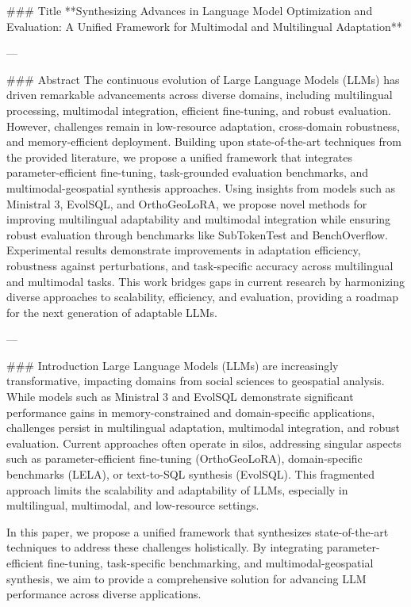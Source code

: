 ### Title  
**Synthesizing Advances in Language Model Optimization and Evaluation: A Unified Framework for Multimodal and Multilingual Adaptation**

---

### Abstract  
The continuous evolution of Large Language Models (LLMs) has driven remarkable advancements across diverse domains, including multilingual processing, multimodal integration, efficient fine-tuning, and robust evaluation. However, challenges remain in low-resource adaptation, cross-domain robustness, and memory-efficient deployment. Building upon state-of-the-art techniques from the provided literature, we propose a unified framework that integrates parameter-efficient fine-tuning, task-grounded evaluation benchmarks, and multimodal-geospatial synthesis approaches. Using insights from models such as Ministral 3, EvolSQL, and OrthoGeoLoRA, we propose novel methods for improving multilingual adaptability and multimodal integration while ensuring robust evaluation through benchmarks like SubTokenTest and BenchOverflow. Experimental results demonstrate improvements in adaptation efficiency, robustness against perturbations, and task-specific accuracy across multilingual and multimodal tasks. This work bridges gaps in current research by harmonizing diverse approaches to scalability, efficiency, and evaluation, providing a roadmap for the next generation of adaptable LLMs.

---

### Introduction  
Large Language Models (LLMs) are increasingly transformative, impacting domains from social sciences to geospatial analysis. While models such as Ministral 3 and EvolSQL demonstrate significant performance gains in memory-constrained and domain-specific applications, challenges persist in multilingual adaptation, multimodal integration, and robust evaluation. Current approaches often operate in silos, addressing singular aspects such as parameter-efficient fine-tuning (OrthoGeoLoRA), domain-specific benchmarks (LELA), or text-to-SQL synthesis (EvolSQL). This fragmented approach limits the scalability and adaptability of LLMs, especially in multilingual, multimodal, and low-resource settings.

In this paper, we propose a unified framework that synthesizes state-of-the-art techniques to address these challenges holistically. By integrating parameter-efficient fine-tuning, task-specific benchmarking, and multimodal-geospatial synthesis, we aim to provide a comprehensive solution for advancing LLM performance across diverse applications. 

